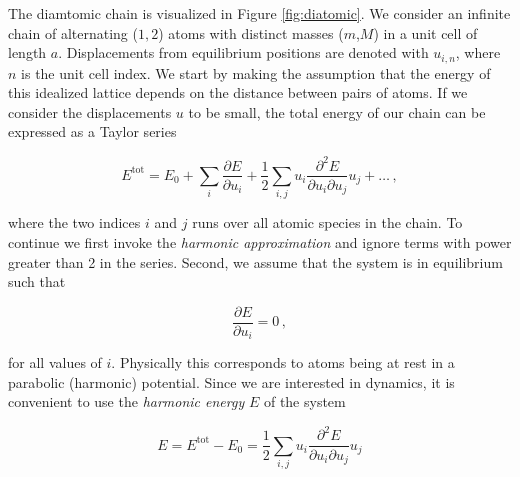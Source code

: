 The diamtomic chain is visualized in Figure \ref{fig:diatomic}. We consider an infinite chain of alternating ($1,2$) atoms with distinct masses ($m$,$M$) in a unit cell of length $a$. Displacements from equilibrium positions are denoted with $u_{i,n}$, where $n$ is the unit cell index. We start by making the assumption that the energy of this idealized lattice depends on the distance between pairs of atoms. If we consider the displacements $u$ to be small, the total energy of our chain can be expressed as a Taylor series

\[ E^\text{tot} = E_0 + \sum_i \frac{\partial E}{\partial u_{i}}  + \frac{1}{2} \sum_{i,j} u_{i} \frac{\partial ^2 E}{\partial u_{i} \partial u_{j}} u_{j} + \dots \, , \]

\noindent where the two indices $i$ and $j$ runs over all atomic species in the chain. To continue we first invoke the \emph{harmonic approximation} and ignore terms with power greater than 2 in the series. Second, we assume that the system is in equilibrium such that

\[ \frac{\partial E}{\partial u_{i}} = 0 \, , \]

\noindent for all values of $i$. Physically this corresponds to atoms being at rest in a parabolic (harmonic) potential. Since we are interested in  dynamics, it is convenient to use the \emph{harmonic energy} $E$ of the system

\[ E = E^\text{tot} - E_0 = \frac{1}{2} \sum_{i,j} u_{i} \frac{\partial ^2 E}{\partial u_{i} \partial u_{j}} u_{j} \]




